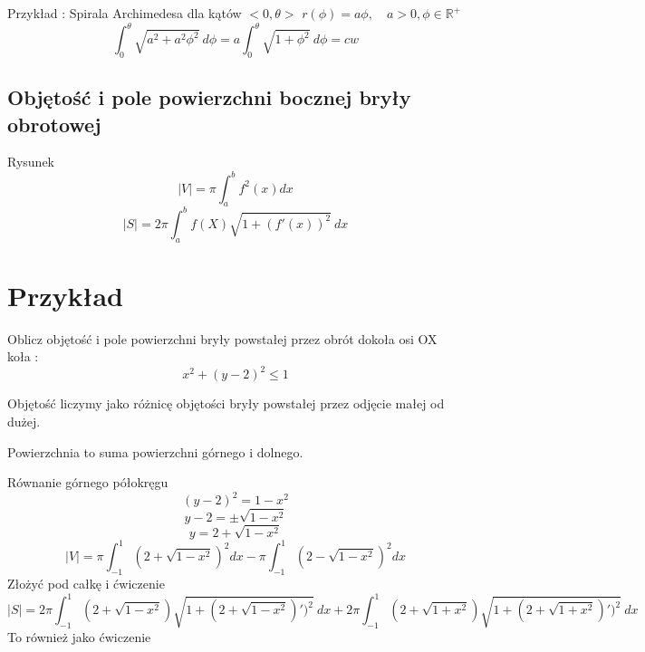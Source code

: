 \documentclass[11pt]{article}
\begin{document}
Przykład : Spirala Archimedesa dla kątów $<0,\theta>$
$r(\phi) = a \phi , \quad a > 0 , \phi \in \mathbb{R}^+$
$$\int_0^\theta \sqrt{a^2 + a^2\phi^2}\ d\phi = a \int_0^\theta \sqrt{1 + \phi^2} \ d\phi  = cw$$

\subsection{Objętość i pole powierzchni bocznej bryły obrotowej}
Rysunek
$$ |V| = \pi \int_a^b f^2(x) dx $$
$$ |S| = 2\pi \int_a^b f(X)\sqrt{1+ (f'(x))^2}\ dx$$

\section{Przykład}
Oblicz objętość i pole powierzchni bryły powstałej przez obrót dokoła osi OX koła :
$$ x^2 + ( y - 2)^2 \leq 1 $$

Objętość liczymy jako różnicę objętości bryły powstałej przez odjęcie małej od dużej.

Powierzchnia to suma powierzchni górnego i dolnego.

Równanie górnego półokręgu 
$$(y-2)^2 = 1 - x^2$$
$$ y - 2 = \pm \sqrt{1-x^2}$$
$$ y = 2 + \sqrt{1-x^2}$$
$$ |V| = \pi \int_{-1}^1 ( 2 + \sqrt{1-x^2})^2 dx - \pi \int_{-1}^1 ( 2  - \sqrt{1-x^2} )^2 dx $$
Złożyć pod całkę i ćwiczenie 
$$ |S| = 2\pi \int_{-1}^1 ( 2 + \sqrt{1-x^2}) \sqrt{1 + (2+ \sqrt{1-x^2})')^2} \ dx + 2\pi \int_{-1}^1 ( 2 + \sqrt{1+x^2}) \sqrt{1 + (2+ \sqrt{1+x^2})')^2} \ dx$$
To również jako ćwiczenie
\end{document}
